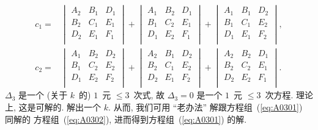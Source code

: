 \documentclass[%
    UTF8,%
    fontset=none,%
    punct=kaiming,%
    zihao=-4,%
    a4paper,%
    oneside,%
]{ctexbook}
\renewcommand*{\leq}{\leqslant}
\begin{document}
\begin{align*}
    c_1
    = {} &
    \begin{vmatrix}
        A_2 & B_1 & D_1 \\
        B_2 & C_1 & E_1 \\
        D_2 & E_1 & F_1 \\
    \end{vmatrix}
    +
    \begin{vmatrix}
        A_1 & B_2 & D_1 \\
        B_1 & C_2 & E_1 \\
        D_1 & E_2 & F_1 \\
    \end{vmatrix}
    +
    \begin{vmatrix}
        A_1 & B_1 & D_2 \\
        B_1 & C_1 & E_2 \\
        D_1 & E_1 & F_2 \\
    \end{vmatrix}, \\
    c_2
    = {} &
    \begin{vmatrix}
        A_1 & B_2 & D_2 \\
        B_1 & C_2 & E_2 \\
        D_1 & E_2 & F_2 \\
    \end{vmatrix}
    +
    \begin{vmatrix}
        A_2 & B_1 & D_2 \\
        B_2 & C_1 & E_2 \\
        D_2 & E_1 & F_2 \\
    \end{vmatrix}
    +
    \begin{vmatrix}
        A_2 & B_2 & D_1 \\
        B_2 & C_2 & E_1 \\
        D_2 & E_2 & F_1 \\
    \end{vmatrix}.
\end{align*}
\(\Delta_3\) 是一个 (关于 \(k\)~的) \(1\)~元 \({\leq} 3\)~次式,
故 \(\Delta_3 = 0\) 是一个 \(1\)~元 \({\leq} 3\)~次方程.
理论上, 这是可解的.
解出一个 \(k\).
从而, 我们可用 ``老办法''
解跟方程组~(\ref{eq:A0301}) 同解的%
方程组~(\ref{eq:A0302}),
进而得到方程组~(\ref{eq:A0301}) 的解.
\end{document}
